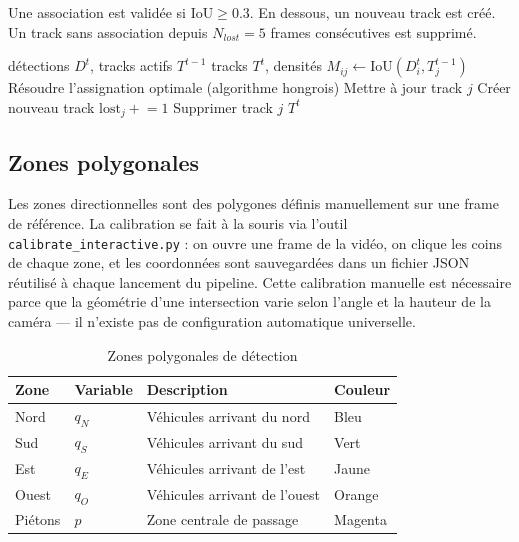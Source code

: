 Une association est validée si
$\text{IoU} \geq 0.3$. En dessous,
un nouveau track est créé. Un track
sans association depuis $N_{lost} = 5$
frames consécutives est supprimé.

\begin{algorithm}[H]
\caption{Tracking IoU — M3}
\begin{algorithmic}[1]
\REQUIRE détections $D^t$,
         tracks actifs $T^{t-1}$
\ENSURE tracks $T^t$, densités
\STATE $M_{ij} \leftarrow
  \text{IoU}(D_i^t, T_j^{t-1})$
\STATE Résoudre l'assignation optimale
  (algorithme hongrois)
  \STATE Mettre à jour track $j$
\ENDFOR
{}
  \STATE Créer nouveau track
\ENDFOR
{}
  \STATE $\text{lost}_j \mathrel{+}= 1$
    \STATE Supprimer track $j$
  \ENDIF
\ENDFOR
\RETURN $T^t$
\end{algorithmic}
\end{algorithm}

\subsection{Zones polygonales}

Les zones directionnelles sont des
polygones définis manuellement sur
une frame de référence. La calibration
se fait à la souris via l'outil
\texttt{calibrate\_interactive.py} :
on ouvre une frame de la vidéo, on
clique les coins de chaque zone, et
les coordonnées sont sauvegardées dans
un fichier JSON réutilisé à chaque
lancement du pipeline. Cette calibration
manuelle est nécessaire parce que la
géométrie d'une intersection varie
selon l'angle et la hauteur de la
caméra — il n'existe pas de configuration
automatique universelle.

\begin{table}[H]
\centering
\caption{Zones polygonales de détection}
\begin{tabularx}{\textwidth}{llXl}
\toprule
\textbf{Zone} &
\textbf{Variable} &
\textbf{Description} &
\textbf{Couleur} \\
\midrule
Nord    & $q_N$ &
Véhicules arrivant du nord & Bleu \\
Sud     & $q_S$ &
Véhicules arrivant du sud & Vert \\
Est     & $q_E$ &
Véhicules arrivant de l'est & Jaune \\
Ouest   & $q_O$ &
Véhicules arrivant de l'ouest & Orange \\
Piétons & $p$   &
Zone centrale de passage & Magenta \\
\bottomrule
\end{tabularx}
\label{tab:zones}
\end{table}


